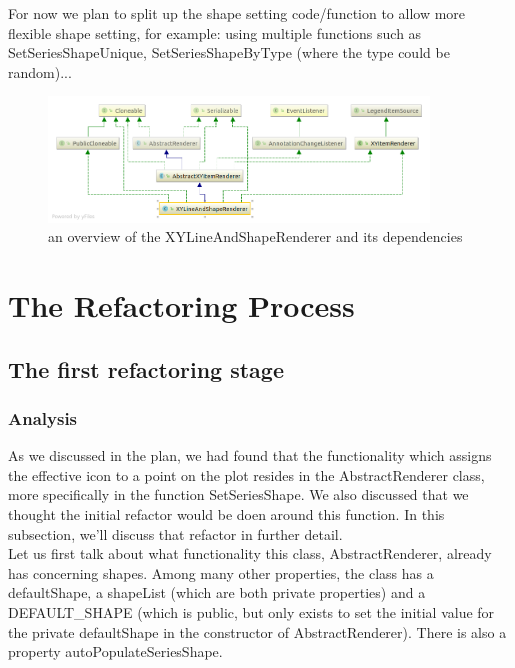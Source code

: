 \documentclass{article}
\begin{document}
For now we plan to split up the shape setting code/function to allow more flexible shape setting, for example: using multiple functions such as SetSeriesShapeUnique, SetSeriesShapeByType (where the type could be random)...

\begin{figure}[H]
\centering
	\includegraphics[width=0.9\textwidth]{XYLineAndShapeRenderer.png}
	\caption{an overview of the XYLineAndShapeRenderer and its dependencies}
\end{figure}

\section{The Refactoring Process}

\subsection{The first refactoring stage}

\subsubsection{Analysis}

As we discussed in the plan, we had found that the functionality which assigns the effective icon to a point on the plot resides in the AbstractRenderer class, more specifically in the function SetSeriesShape. We also discussed that we thought the initial refactor would be doen around this function. In this subsection, we'll discuss that refactor in further detail.\\

Let us first talk about what functionality this class, AbstractRenderer, already has concerning shapes. Among many other properties, the class has a defaultShape, a shapeList (which are both private properties) and a DEFAULT\_SHAPE (which is public, but only exists to set the initial value for the private defaultShape in the constructor of AbstractRenderer). There is also a property autoPopulateSeriesShape.\\
\end{document}
